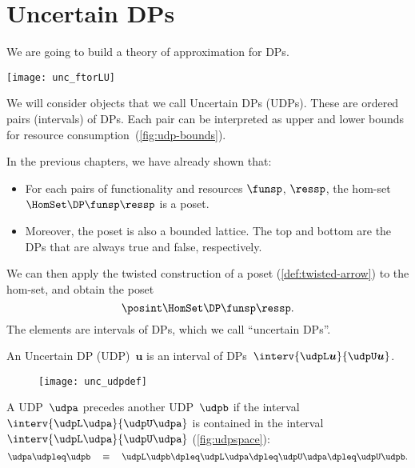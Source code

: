 \section{Uncertain DPs}

We are going to build a theory of approximation for DPs.

\begin{marginfigure}
    \texttt{[image: unc\_ftorLU]}
    \caption{}
    \label{fig:udp-bounds}
\end{marginfigure}

We will consider objects that we call Uncertain DPs (UDPs).
These are ordered pairs (intervals) of DPs.
Each pair can be interpreted as upper and lower bounds for resource consumption~(\cref{fig:udp-bounds}).


In the previous chapters, we have already shown that:
\begin{itemize}
    \item For each pairs of functionality and resources $\funsp$, $\ressp$, the hom-set $\HomSet\DP\funsp\ressp$
          is a poset.
    \item Moreover, the poset is also a bounded lattice.
          The top and bottom are the DPs that are always true and false, respectively.
\end{itemize}

We can then apply the twisted construction of a poset (\cref{def:twisted-arrow}) to the hom-set, and obtain the poset
\begin{equation}
    \posint \HomSet\DP\funsp\ressp.
\end{equation}
%
The elements are intervals of DPs, which we call ``uncertain DPs''.

\begin{definition}
    An Uncertain DP (UDP)~$\boldsymbol{u}$ is an interval of DPs~$\interv{\udpL\boldsymbol{u}}{\udpU\boldsymbol{u}}$.
\end{definition}

\begin{figure}[h!]
    \texttt{[image: unc\_udpdef]}
    \caption{}
\end{figure}

\begin{definition}
    A UDP~$\udpa$ precedes another UDP~$\udpb$ if the interval~$\interv{\udpL\udpa}{\udpU\udpa}$
    is contained in the interval~$\interv{\udpL\udpa}{\udpU\udpa}$ (\cref{fig:udpspace}):
    \begin{equation}
        \udpa\udpleq\udpb\quad\equiv\quad\udpL\udpb\dpleq\udpL\udpa\dpleq\udpU\udpa\dpleq\udpU\udpb.
    \end{equation}
\end{definition}

